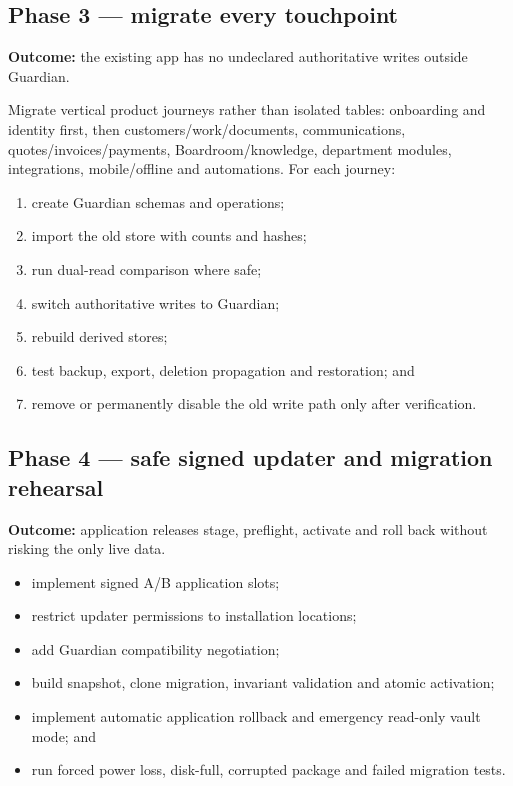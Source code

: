 \documentclass[11pt]{article}
\begin{document}
\subsection{Phase 3 --- migrate every touchpoint}

\textbf{Outcome:} the existing app has no undeclared authoritative writes outside Guardian.

Migrate vertical product journeys rather than isolated tables: onboarding and identity first, then customers/work/documents, communications, quotes/invoices/payments, Boardroom/knowledge, department modules, integrations, mobile/offline and automations. For each journey:

\begin{enumerate}
  \item create Guardian schemas and operations;
  \item import the old store with counts and hashes;
  \item run dual-read comparison where safe;
  \item switch authoritative writes to Guardian;
  \item rebuild derived stores;
  \item test backup, export, deletion propagation and restoration; and
  \item remove or permanently disable the old write path only after verification.
\end{enumerate}

\subsection{Phase 4 --- safe signed updater and migration rehearsal}

\textbf{Outcome:} application releases stage, preflight, activate and roll back without risking the only live data.

\begin{itemize}
  \item implement signed A/B application slots;
  \item restrict updater permissions to installation locations;
  \item add Guardian compatibility negotiation;
  \item build snapshot, clone migration, invariant validation and atomic activation;
  \item implement automatic application rollback and emergency read-only vault mode; and
  \item run forced power loss, disk-full, corrupted package and failed migration tests.
\end{itemize}
\end{document}
